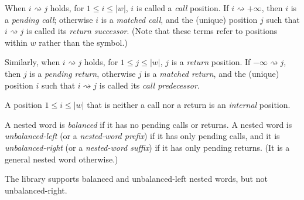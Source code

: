 When $i \rightsquigarrow j$ holds, for $1 \leq i \leq |w|$, $i$ is called a
\textsl{call} position. If $i \rightsquigarrow +\infty$, then $i$ is a
\textsl{pending call}; otherwise $i$ is a \textsl{matched call}, and the
(unique) position $j$ such that $i \rightsquigarrow j$ is called its
\textsl{return successor}. (Note that these terms refer to positions within
$w$ rather than the symbol.)

Similarly, when $i \rightsquigarrow j$ holds, for $1 \leq j \leq |w|$, $j$
is a \textsl{return} position. If $-\infty \rightsquigarrow j$, then $j$ is
a \textsl{pending return}, otherwise $j$ is a \textsl{matched return}, and
the (unique) position $i$ such that $i \rightsquigarrow j$ is called its
\textsl{call predecessor}.

A position $1 \leq i \leq |w|$ that is neither a call nor a return is an
\textsl{internal} position.

A nested word is \textsl{balanced} if it has no pending calls
or returns.  A nested word is \textsl{unbalanced-left} (or a
\textsl{nested-word prefix}) if it has only pending calls, and it is
\textsl{unbalanced-right} (or a \textsl{nested-word suffix})
if it has only pending returns. (It is a general nested word otherwise.)


The library supports balanced and unbalanced-left nested words, but not
unbalanced-right.


